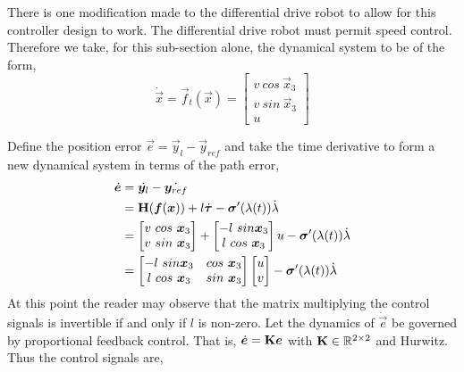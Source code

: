 \documentclass[oneside, 11pt]{book}
\begin{document}
There is one modification made to the differential drive robot to allow for this controller design to work. The differential drive robot must permit speed control. Therefore we take, for this sub-section alone, the dynamical system to be of the form,
\begin{equation}
    \dot{\vec{x}} = \vec{f}_t(\vec{x}) =
        \begin{bmatrix}
            v~cos~\vec{x}_3 \\
            v~sin~\vec{x}_3 \\
            u
        \end{bmatrix}
\end{equation}

Define the position error $\vec{e} = \vec{y}_l - \vec{y}_{ref}$ and take the time derivative to form a new dynamical system in terms of the path error,
\begin{align*}
    \dot{\bm{e}}   &= \dot{\bm{y}_l} - \dot{\bm{y}_{ref}}\\
                    &= \mathbf{H}(\bm{f}(\bm{x})) + l\dot{\bm{\tau}} - \bm{\sigma}'(\lambda(t))\dot{\lambda}\\
                    &= \begin{bmatrix} v~cos~\bm{x}_3 \\ v~sin~\bm{x}_3 \end{bmatrix}
                        +
                        \begin{bmatrix} -l~sin\bm{x}_3 \\ l~cos~\bm{x}_3 \end{bmatrix} u
                        -
                        \bm{\sigma}'(\lambda(t))\dot{\lambda}\\
                    &=  \begin{bmatrix}
                            -l~sin\bm{x}_3 & cos~\bm{x}_3 \\
                            l~cos~\bm{x}_3 & sin~\bm{x}_3 \\
                        \end{bmatrix}
                        \begin{bmatrix}
                            u \\ v
                        \end{bmatrix}
                        -
                        \bm{\sigma}'(\lambda(t))\dot{\lambda}
\end{align*}
At this point the reader may observe that the matrix multiplying the control signals is invertible if and only if $l$ is non-zero. Let the dynamics of $\dot{\vec{e}}$ be governed by proportional feedback control. That is, $\dot{\bm{e}}=\mathbf{K}\bm{e}$ with $\mathbf{K}\in\mathbb{R}^{2\times2}$ and Hurwitz. Thus the control signals are,
\end{document}

